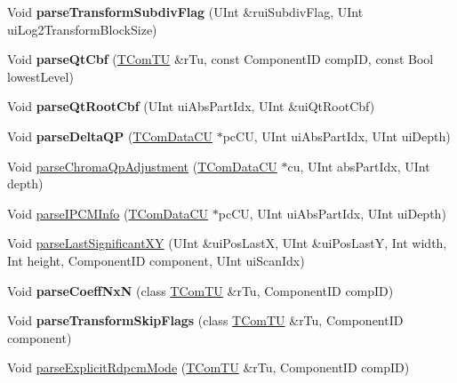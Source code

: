 \begin{DoxyCompactItemize}
\mbox{\label{class_t_dec_sbac_af3fb1e45f21b9876caaddfc346982728}} 
Void {\bfseries parse\+Transform\+Subdiv\+Flag} (U\+Int \&rui\+Subdiv\+Flag, U\+Int ui\+Log2\+Transform\+Block\+Size)
\item 
\mbox{\label{class_t_dec_sbac_a67474625057d5fb02203c0ac8da07847}} 
Void {\bfseries parse\+Qt\+Cbf} (\hyperlink{class_t_com_t_u}{T\+Com\+TU} \&r\+Tu, const Component\+ID comp\+ID, const Bool lowest\+Level)
\item 
\mbox{\label{class_t_dec_sbac_af4f0997e064fe2c2517ddc9ab7b94735}} 
Void {\bfseries parse\+Qt\+Root\+Cbf} (U\+Int ui\+Abs\+Part\+Idx, U\+Int \&ui\+Qt\+Root\+Cbf)
\item 
\mbox{\label{class_t_dec_sbac_a01a89215a3779c0398ac7c1a22a99f0f}} 
Void {\bfseries parse\+Delta\+QP} (\hyperlink{class_t_com_data_c_u}{T\+Com\+Data\+CU} $\ast$pc\+CU, U\+Int ui\+Abs\+Part\+Idx, U\+Int ui\+Depth)
\item 
Void \hyperlink{class_t_dec_sbac_ab4b66a3f1f2268f1d99c7c9bf7624138}{parse\+Chroma\+Qp\+Adjustment} (\hyperlink{class_t_com_data_c_u}{T\+Com\+Data\+CU} $\ast$cu, U\+Int abs\+Part\+Idx, U\+Int depth)
\item 
Void \hyperlink{class_t_dec_sbac_ad1f8b5bf9b9d41427e722f442d3f9deb}{parse\+I\+P\+C\+M\+Info} (\hyperlink{class_t_com_data_c_u}{T\+Com\+Data\+CU} $\ast$pc\+CU, U\+Int ui\+Abs\+Part\+Idx, U\+Int ui\+Depth)
\item 
Void \hyperlink{class_t_dec_sbac_a140a67c098a4366ceeef63d8c7f84409}{parse\+Last\+Significant\+XY} (U\+Int \&ui\+Pos\+LastX, U\+Int \&ui\+Pos\+LastY, Int width, Int height, Component\+ID component, U\+Int ui\+Scan\+Idx)
\item 
\mbox{\label{class_t_dec_sbac_a86998e77de6b40c81a5a366aa012f6c0}} 
Void {\bfseries parse\+Coeff\+NxN} (class \hyperlink{class_t_com_t_u}{T\+Com\+TU} \&r\+Tu, Component\+ID comp\+ID)
\item 
\mbox{\label{class_t_dec_sbac_a48d3bfafc275eee7068013baeabb7be6}} 
Void {\bfseries parse\+Transform\+Skip\+Flags} (class \hyperlink{class_t_com_t_u}{T\+Com\+TU} \&r\+Tu, Component\+ID component)
\item 
Void \hyperlink{class_t_dec_sbac_ad50dc61f59c8fd801b3939a2ffa14995}{parse\+Explicit\+Rdpcm\+Mode} (\hyperlink{class_t_com_t_u}{T\+Com\+TU} \&r\+Tu, Component\+ID comp\+ID)
\end{DoxyCompactItemize}


